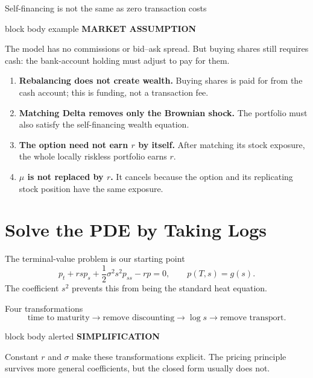 \documentclass[handout,10pt,aspectratio=169]{beamer}
\newenvironment{marketbox}{%
  \begin{beamercolorbox}[rounded=true,sep=0.7em,wd=\textwidth]{block body example}
  \textbf{\color{CourseGreen}MARKET ASSUMPTION}\quad
}{\end{beamercolorbox}}
\newenvironment{simplificationbox}{%
  \begin{beamercolorbox}[rounded=true,sep=0.7em,wd=\textwidth]{block body alerted}
  \textbf{\color{CourseRed}SIMPLIFICATION}\quad
}{\end{beamercolorbox}}
\newcommand{\1}{\mathbf 1}
\begin{document}
\begin{frame}{Self-financing is not the same as zero transaction costs}
\small
\begin{marketbox}
The model has no commissions or bid--ask spread. But buying shares still
requires cash: the bank-account holding must adjust to pay for them.
\end{marketbox}
\begin{enumerate}
\setlength{\itemsep}{0.2em}
  \item \textbf{Rebalancing does not create wealth.} Buying shares is paid
        for from the cash account; this is funding, not a transaction fee.
  \item \textbf{Matching Delta removes only the Brownian shock.} The
        portfolio must also satisfy the self-financing wealth equation.
  \item \textbf{The option need not earn \(r\) by itself.} After matching
        its stock exposure, the whole locally riskless portfolio earns \(r\).
  \item \textbf{\(\mu\) is not replaced by \(r\).} It cancels because the
        option and its replicating stock position have the same exposure.
\end{enumerate}
\end{frame}

\section{Solve the PDE by Taking Logs}

\begin{frame}{The terminal-value problem is our starting point}
\[
p_t+rsp_s+\frac12\sigma^2s^2p_{ss}-rp=0,
\qquad
p(T,s)=g(s).
\]
The coefficient \(s^2\) prevents this from being the standard heat equation.
\begin{block}{Four transformations}
\[
\text{time to maturity}
\longrightarrow
\text{remove discounting}
\longrightarrow
\log s
\longrightarrow
\text{remove transport}.
\]
\end{block}
\begin{simplificationbox}
Constant \(r\) and \(\sigma\) make these transformations explicit. The pricing
principle survives more general coefficients, but the closed form usually does
not.
\end{simplificationbox}
\end{frame}
\end{document}
